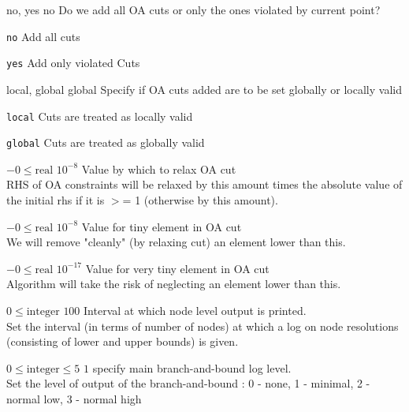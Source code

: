 %
{\ttfamily no, yes}%
{no}%
{Do we add all OA cuts or only the ones violated by current point?}%
{\begin{list}{}{
\setlength{\parsep}{0em}
\setlength{\leftmargin}{5ex}
\setlength{\labelwidth}{2ex}
\setlength{\itemindent}{0ex}
\setlength{\topsep}{0pt}}
\item[\texttt{no}] Add all cuts
\item[\texttt{yes}] Add only violated Cuts
\end{list}
}

%
{\ttfamily local, global}%
{global}%
{Specify if OA cuts added are to be set globally or locally valid}%
{\begin{list}{}{
\setlength{\parsep}{0em}
\setlength{\leftmargin}{5ex}
\setlength{\labelwidth}{2ex}
\setlength{\itemindent}{0ex}
\setlength{\topsep}{0pt}}
\item[\texttt{local}] Cuts are treated as locally valid
\item[\texttt{global}] Cuts are treated as globally valid
\end{list}
}

%
{$-0\leq\textrm{real}$}%
{$10^{- 8}$}%
{Value by which to relax OA cut\\
RHS of OA constraints will be relaxed by this amount times the absolute value of the initial rhs if it is $>$= 1 (otherwise by this amount).}%
{}

%
{$-0\leq\textrm{real}$}%
{$10^{- 8}$}%
{Value for tiny element in OA cut\\
We will remove "cleanly" (by relaxing cut) an element lower than this.}%
{}

%
{$-0\leq\textrm{real}$}%
{$10^{-17}$}%
{Value for very tiny element in OA cut\\
Algorithm will take the risk of neglecting an element lower than this.}%
{}

%
{$0\leq\textrm{integer}$}%
{$100$}%
{Interval at which node level output is printed.\\
Set the interval (in terms of number of nodes) at which a log on node resolutions (consisting of lower and upper bounds) is given.}%
{}

%
{$0\leq\textrm{integer}\leq5$}%
{$1$}%
{specify main branch-and-bound log level.\\
Set the level of output of the branch-and-bound : 0 - none, 1 - minimal, 2 - normal low, 3 - normal high}%
{}

